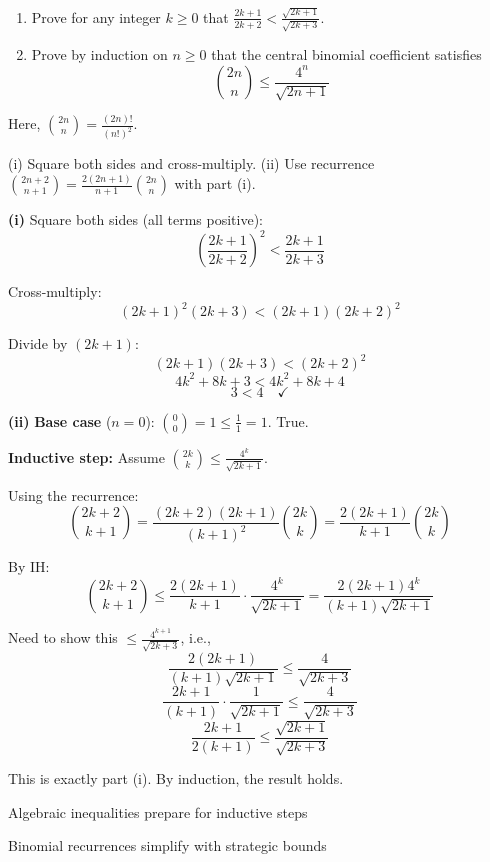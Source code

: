 \begin{problem}
\begin{enumerate}
    \item[(i)] Prove for any integer $k \ge 0$ that $\frac{2k+1}{2k+2} < \frac{\sqrt{2k+1}}{\sqrt{2k+3}}$.
    \item[(ii)] Prove by induction on $n \ge 0$ that the central binomial coefficient satisfies
    \[ \binom{2n}{n} \le \frac{4^n}{\sqrt{2n+1}} \]
\end{enumerate}

Here, $\binom{2n}{n} = \frac{(2n)!}{(n!)^2}$.
\end{problem}

\begin{hint}
(i) Square both sides and cross-multiply. (ii) Use recurrence $\binom{2n+2}{n+1} = \frac{2(2n+1)}{n+1}\binom{2n}{n}$ with part (i).
\end{hint}

\begin{solution}
\textbf{(i)} Square both sides (all terms positive):
\[ \left(\frac{2k+1}{2k+2}\right)^2 < \frac{2k+1}{2k+3} \]

Cross-multiply:
\[ (2k+1)^2(2k+3) < (2k+1)(2k+2)^2 \]

Divide by $(2k+1)$:
\[ (2k+1)(2k+3) < (2k+2)^2 \]
\[ 4k^2 + 8k + 3 < 4k^2 + 8k + 4 \]
\[ 3 < 4 \quad \checkmark \]

\textbf{(ii)} \textbf{Base case} ($n=0$): $\binom{0}{0} = 1 \le \frac{1}{1} = 1$. True.

\textbf{Inductive step:} Assume $\binom{2k}{k} \le \frac{4^k}{\sqrt{2k+1}}$.

Using the recurrence:
\[ \binom{2k+2}{k+1} = \frac{(2k+2)(2k+1)}{(k+1)^2}\binom{2k}{k} = \frac{2(2k+1)}{k+1}\binom{2k}{k} \]

By IH:
\[ \binom{2k+2}{k+1} \le \frac{2(2k+1)}{k+1} \cdot \frac{4^k}{\sqrt{2k+1}} = \frac{2(2k+1)4^k}{(k+1)\sqrt{2k+1}} \]

Need to show this $\le \frac{4^{k+1}}{\sqrt{2k+3}}$, i.e.,
\[ \frac{2(2k+1)}{(k+1)\sqrt{2k+1}} \le \frac{4}{\sqrt{2k+3}} \]
\[ \frac{2k+1}{(k+1)} \cdot \frac{1}{\sqrt{2k+1}} \le \frac{4}{\sqrt{2k+3}} \]
\[ \frac{2k+1}{2(k+1)} \le \frac{\sqrt{2k+1}}{\sqrt{2k+3}} \]

This is exactly part (i). By induction, the result holds.
\end{solution}

\begin{takeaways}

\item Algebraic inequalities prepare for inductive steps
\item Binomial recurrences simplify with strategic bounds

\end{takeaways}
